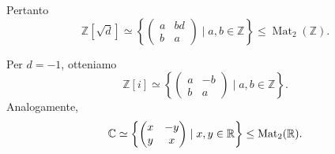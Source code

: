 \documentclass[a4paper]{article}
\begin{document}
\begin{radioactive}
\begin{snippetsolution}{}
    Pertanto
    \[
        \mathbb{Z}[\sqrt{d}]
        \simeq
        \left\{
            \begin{pmatrix}
                a & bd \\
                b & a
            \end{pmatrix}
            \mid
            a,b\in\mathbb{Z}
        \right\}
        \leq
        \operatorname{Mat}_2(\mathbb{Z}).
    \]
\end{snippetsolution}
\end{radioactive}

\begin{radioactive}
\begin{snippetexample}{}
    Per \(d=-1\), otteniamo
    \[
        \mathbb{Z}[i]
        \simeq
        \left\{
            \begin{pmatrix}
                a & -b \\
                b & a
            \end{pmatrix}
            \mid
            a,b\in\mathbb{Z}
        \right\}.
    \]
    Analogamente,
    \[
        \mathbb{C}
        \simeq
        \left\{
            \begin{pmatrix}
                x & -y \\
                y & x
            \end{pmatrix}
            \mid
            x,y\in\mathbb{R}
        \right\}
        \leq
        \operatorname{Mat}_2(\mathbb{R}).
    \]
\end{snippetexample}
\end{radioactive}
\end{document}
